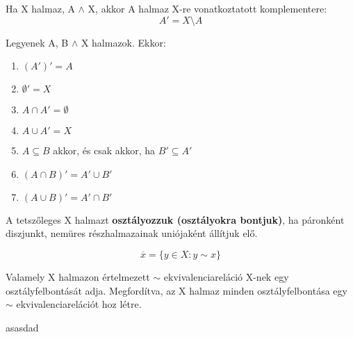 \begin{frame}

\begin{tcolorbox}[title={Definíció: Komplementer}]
Ha X halmaz, A $\wedge$ X, akkor A halmaz X-re vonatkoztatott komplementere:\\
$$A' = X \setminus A$$
\end{tcolorbox}

\begin{tcolorbox}[title={Tétel: A komplementer tulajdonságai}]
Legyenek A, B $\wedge$ X halmazok. Ekkor:

\begin{enumerate}
\item $(A')' = A$
\item $\emptyset' = X$
\item $A \cap A' = \emptyset$
\item $A \cup A' = X$
\item $A \subseteq B$ akkor, és csak akkor, ha $B' \subseteq A'$
\item $(A \cap B)' = A' \cup B'$
\item $(A \cup B)' = A' \cap B'$
\end{enumerate}
\end{tcolorbox}

\end{frame}

\begin{frame}

\begin{tcolorbox}[title={Definíció: Halmaz osztályfelbontása}]
A tetszőleges X halmazt \textbf{osztályozzuk (osztályokra bontjuk)}, ha páronként diszjunkt, nemüres részhalmazainak uniójaként állítjuk elő.
\end{tcolorbox}

\begin{tcolorbox}[title={Az X $\in$ X elem \textbf{ekvivalencia osztálya}:}]
$$\overline{x} = \{y \in X : y \sim x\}$$
\end{tcolorbox}

\begin{tcolorbox}[title={Tétel: Ekvivalenciareláció és osztályfelbontás kapcsolata}]
Valamely X halmazon értelmezett $\sim$ ekvivalenciareláció X-nek egy osztályfelbontását adja. Megfordítva, az X halmaz minden osztályfelbontása egy $\sim$ ekvivalenciarelációt hoz létre.
\end{tcolorbox}

\begin{tcolorbox}[title={Biz}]
asasdad
\end{tcolorbox}

\end{frame}



